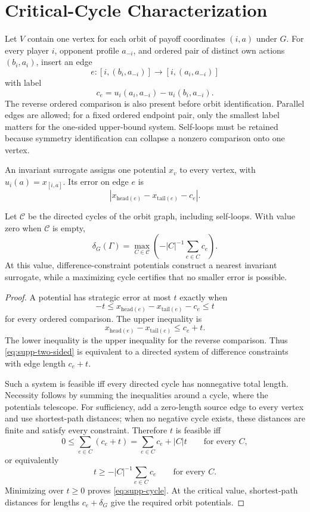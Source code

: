 \section{Critical-Cycle Characterization}

Let $V$ contain one vertex for each orbit of payoff coordinates $(i,a)$ under $G$.  For every player $i$, opponent profile $a_{-i}$, and ordered pair of distinct own actions $(b_i,a_i)$, insert an edge
\[
e:[i,(b_i,a_{-i})]\longrightarrow[i,(a_i,a_{-i})]
\]
with label
\[
c_e=u_i(a_i,a_{-i})-u_i(b_i,a_{-i}).
\]
The reverse ordered comparison is also present before orbit identification.  Parallel edges are allowed; for a fixed ordered endpoint pair, only the smallest label matters for the one-sided upper-bound system.  Self-loops must be retained because symmetry identification can collapse a nonzero comparison onto one vertex.

An invariant surrogate assigns one potential $x_v$ to every vertex, with
$\widehat u_i(a)=x_{[i,a]}$.  Its error on edge $e$ is
\[
|x_{\mathrm{head}(e)}-x_{\mathrm{tail}(e)}-c_e|.
\]

\begin{theorem}
\label{thm:supp-cycle}
Let $\mathcal C$ be the directed cycles of the orbit graph, including self-loops.  With value zero when $\mathcal C$ is empty,
\begin{equation}
\delta_G(\Gamma)
=
\max_{C\in\mathcal C}
\left(-|C|^{-1}\sum_{e\in C}c_e\right).
\label{eq:supp-cycle}
\end{equation}
At this value, difference-constraint potentials construct a nearest invariant surrogate, while a maximizing cycle certifies that no smaller error is possible.
\end{theorem}
\begin{proof}
A potential has strategic error at most $t$ exactly when
\begin{equation}
-t
\le
x_{\mathrm{head}(e)}-x_{\mathrm{tail}(e)}-c_e
\le t
\label{eq:supp-two-sided}
\end{equation}
for every ordered comparison.  The upper inequality is
\[
x_{\mathrm{head}(e)}-x_{\mathrm{tail}(e)}
\le c_e+t.
\]
The lower inequality is the upper inequality for the reverse comparison.  Thus \eqref{eq:supp-two-sided} is equivalent to a directed system of difference constraints with edge length $c_e+t$.

Such a system is feasible iff every directed cycle has nonnegative total length.  Necessity follows by summing the inequalities around a cycle, where the potentials telescope.  For sufficiency, add a zero-length source edge to every vertex and use shortest-path distances; when no negative cycle exists, these distances are finite and satisfy every constraint.  Therefore $t$ is feasible iff
\[
0\le\sum_{e\in C}(c_e+t)
=
\sum_{e\in C}c_e+|C|t
\qquad\text{for every }C,
\]
or equivalently
\[
t\ge-|C|^{-1}\sum_{e\in C}c_e
\qquad\text{for every }C.
\]
Minimizing over $t\ge0$ proves \eqref{eq:supp-cycle}.  At the critical value, shortest-path distances for lengths $c_e+\delta_G$ give the required orbit potentials.
\end{proof}

